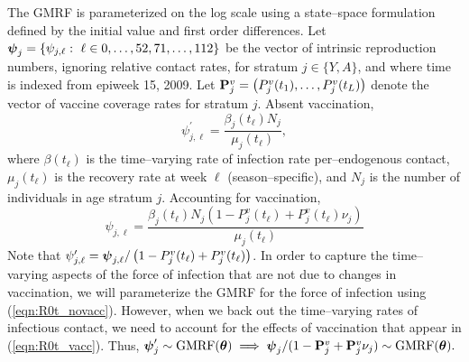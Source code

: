 The GMRF is parameterized on the log scale using a state--space formulation defined by the initial value and first order differences. Let $ \boldsymbol{\psi}_{j} = \lbrace\psi_{j,\ell}:\ \ell \in 0,\dots,52,71,\dots,112\rbrace $ be the vector of intrinsic reproduction numbers, ignoring relative contact rates, for stratum $ j \in \lbrace Y,A \rbrace$, and where time is indexed from epiweek 15, 2009. Let $ \mathbf{P}^v_j = \left (P^v_j(t_1),\dots,P^v_j(t_L)\right )$ denote the vector of vaccine coverage rates for stratum $ j $. Absent vaccination,
\begin{equation}
\label{eqn:R0t_novacc}
\psi^\prime_{j,\ell} = \frac{\beta_j(t_\ell)N_j}{\mu_j(t_\ell)},
\end{equation}
where $ \beta(t_\ell) $ is the time--varying rate of infection rate per--endogenous contact, $ \mu_j(t_\ell) $ is the recovery rate at week $ \ell $ (season--specific), and $ N_{j} $ is the number of individuals in age stratum $ j $. Accounting for vaccination, 
\begin{equation}
\label{eqn:R0t_vacc}
\psi_{j,\ell} = \frac{\beta_j(t_\ell)N_j\left (1 - P^v_j(t_\ell) + P^v_j(t_\ell)\nu_j\right )}{\mu_j(t_\ell)}
\end{equation}
Note that $ \psi_{j,\ell}^\prime = \boldsymbol{\psi}_{j,\ell} / \left (1 - P^v_j(t_\ell) + P^v_j(t_\ell)\right ) $. In order to capture the time--varying aspects of the force of infection that are not due to changes in vaccination, we will parameterize the GMRF for the force of infection using (\ref{eqn:R0t_novacc}). However, when we back out the time--varying rates of infectious contact, we need to account for the effects of vaccination that appear in (\ref{eqn:R0t_vacc}). Thus, $ \boldsymbol{\psi}_j^\prime\sim \mathrm{GMRF}(\boldsymbol{\theta}) \implies\boldsymbol{\psi}_j / (1 - \mathbf{P}^v_j + \mathbf{P}^v_j\nu_j) \sim \mathrm{GMRF}(\boldsymbol{\theta}). $


